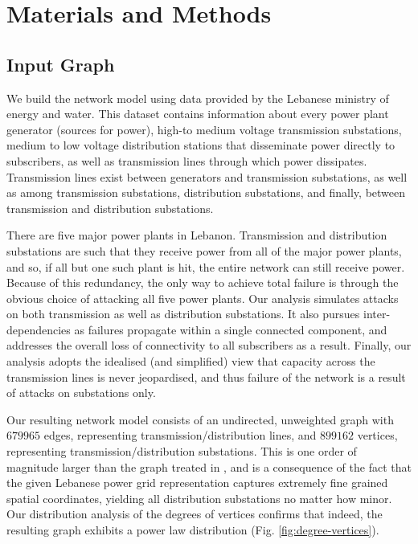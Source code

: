 
\section{Materials and Methods}
\label{methods}

\subsection{Input Graph}

We build the network model using data provided by the Lebanese ministry of energy and water. This dataset contains information about every power plant generator (sources for power), high-to medium voltage transmission substations, medium to low voltage distribution stations that disseminate power directly to subscribers, as well as transmission lines through which power dissipates. Transmission lines exist between generators and transmission substations, as well as among transmission substations, distribution substations, and finally, between transmission and distribution substations. 

There are five major power plants in Lebanon. Transmission and distribution substations are such that they receive power from all of the major power plants, and so, if all but one such plant is hit, the entire network can still receive power. Because of this redundancy, the only way to achieve total failure is through the obvious choice of attacking all five power plants. 
%
%
Our analysis simulates attacks on both transmission as well as distribution substations. It also pursues inter-dependencies as failures propagate within a single connected component, and addresses the overall loss of connectivity to all subscribers as a result. Finally, our analysis adopts the idealised (and simplified) view that capacity across the transmission lines is never jeopardised, and thus failure of the network is a result of attacks on substations only.

Our resulting network model consists of an undirected, unweighted graph with $679965$ edges, representing transmission/distribution lines, and $899162$ vertices, representing transmission/distribution substations. This is one order of magnitude larger than the graph treated in \cite{2000Natur.406..378A}, and is a consequence of the fact that the given Lebanese power grid representation captures extremely fine grained spatial coordinates, yielding all distribution substations no matter how minor. Our distribution analysis of the degrees of vertices confirms that indeed, the resulting graph exhibits a power law distribution (Fig. \ref{fig:degree-vertices}). 

